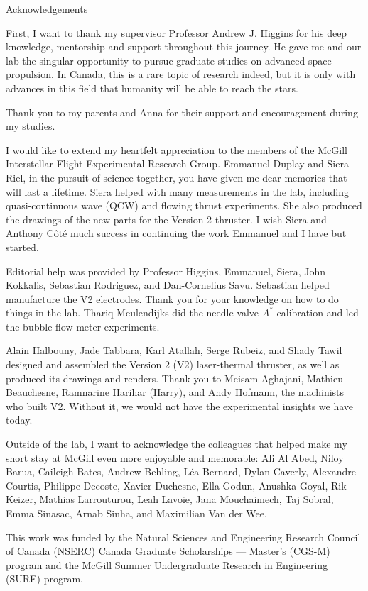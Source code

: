 \begin{plainchp}{Acknowledgements}
    
    First, I want to thank my supervisor Professor Andrew J. Higgins for his deep knowledge, mentorship and support throughout this journey. He gave me and our lab the singular opportunity to pursue graduate studies on advanced space propulsion. In Canada, this is a rare topic of research indeed, but it is only with advances in this field that humanity will be able to reach the stars.

    Thank you to my parents and Anna for their support and encouragement during my studies.

    I would like to extend my heartfelt appreciation to the members of the McGill Interstellar Flight Experimental Research Group. Emmanuel Duplay and Siera Riel, in the pursuit of science together, you have given me dear memories that will last a lifetime. Siera helped with many measurements in the lab, including quasi-continuous wave (QCW) and flowing thrust experiments. She also produced the drawings of the new parts for the Version 2 thruster. I wish Siera and Anthony Côté much success in continuing the work Emmanuel and I have but started.

    Editorial help was provided by Professor Higgins, Emmanuel, Siera, John Kokkalis, Sebastian Rodriguez, and Dan-Cornelius Savu. Sebastian helped manufacture the V2 electrodes. Thank you for your knowledge on how to do things in the lab. Thariq Meulendijks did the needle valve $A^*$ calibration and led the bubble flow meter experiments.

    Alain Halbouny, Jade Tabbara, Karl Atallah, Serge Rubeiz, and Shady Tawil designed and assembled the Version 2 (V2) laser-thermal thruster, as well as produced its drawings and renders. Thank you to Meisam Aghajani, Mathieu Beauchesne, Ramnarine Harihar (Harry), and Andy Hofmann, the machinists who built V2. Without it, we would not have the experimental insights we have today.

    Outside of the lab, I want to acknowledge the colleagues that helped make my short stay at McGill even more enjoyable and memorable: Ali Al Abed, Niloy Barua, Caileigh Bates, Andrew Behling, Léa Bernard, Dylan Caverly, Alexandre Courtis, Philippe Decoste, Xavier Duchesne, Ella Godun, Anushka Goyal, Rik Keizer, Mathias Larrouturou, Leah Lavoie, Jana Mouchaimech, Taj Sobral, Emma Sinasac, Arnab Sinha, and Maximilian Van der Wee.

    This work was funded by the Natural Sciences and Engineering Research Council of Canada (NSERC) Canada Graduate Scholarships — Master's (CGS-M) program and the McGill Summer Undergraduate Research in Engineering (SURE) program.

\end{plainchp}